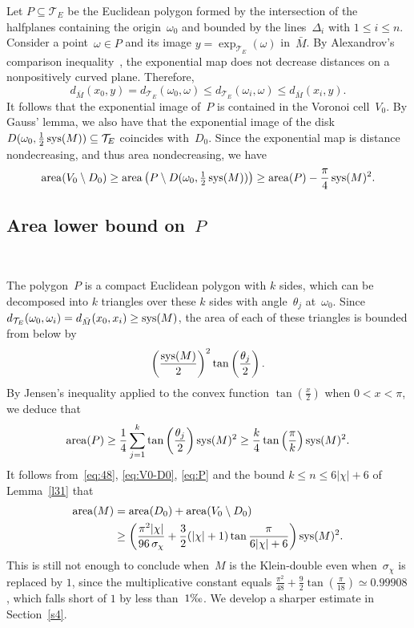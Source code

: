 \documentclass[12pt,reqno]{amsart}
\theoremstyle{definition}
\numberwithin{equation}{section}
\DeclareMathOperator{\area}{{\rm area}}
\DeclareMathOperator{\sys}{{\rm sys}}
\numberwithin{equation}{section}
\begin{document}
Let $P \subseteq \mathcal{T}_E$ be the Euclidean polygon formed by the
intersection of the halfplanes containing the origin~$\omega_0$ and
bounded by the lines~$\Delta_i$ with $1 \leq i \leq n$.  Consider a
point~$\omega \in P$ and its image
$y=\exp_{\mathcal{T}_E}^{\phantom{I^I_I}}(\omega)$ in~$\bar{M}$.  By
  Alexandrov's comparison inequality~\cite[\S II]{BH},
the exponential map does not decrease distances on a nonpositively curved plane.
Therefore,
\[
d_{\bar{M}}(x_0,y) = d_{\mathcal{T}_E}(\omega_0,\omega) \leq d_{\mathcal{T}_E}(\omega_i,\omega) \leq d_{\bar{M}}(x_i,y).
\]
It follows that the exponential image of~$P$ is contained in the Voronoi cell~$V_0$.
By Gauss' lemma, we also have that the exponential image of the disk $D(\omega_0,\frac{1}{2} \sys(M)) \subseteq \mathcal{T}_E$ coincides with~$D_0$.
Since the exponential map is distance nondecreasing, and thus area nondecreasing, we have
\begin{equation} \label{eq:V0-D0}
\area(V_0 \setminus D_0) \geq \area\big(P \setminus D(\omega_0,\tfrac{1}{2} \sys(M))\big) \geq \area(P) - \frac{\pi}{4} \sys(M)^2.
\end{equation}

\subsection{Area lower bound on~$P$} \label{sec:PP}

\mbox{ } \medskip

The polygon~$P$ is a compact Euclidean polygon with $k$ sides, which can be decomposed into $k$ triangles over these $k$ sides with angle~$\theta_j$ at~$\omega_0$.
Since $d_{\mathcal{T}_E}(\omega_0,\omega_i) = d_{\bar{M}}(x_0,x_i) \geq \sys(M)$, the area of each of these triangles is bounded from below by
\begin{equation} \label{eq:tan}
\left( \frac{\sys(M)}{2} \right)^2 \tan \left( \frac{\theta_j}{2} \right).
\end{equation}
By Jensen's inequality applied to the convex function $\tan(\frac{x}{2})$ when $0<x<\pi$, we deduce that
\begin{equation} \label{eq:P}
\area(P) \geq \frac{1}{4}  \sum_{j=1}^k \tan \left( \frac{\theta_j}{2} \right) \sys(M)^2 \geq \frac{k}{4}  \tan \left( \frac{\pi}{k} \right)  \sys(M)^2.
\end{equation}
It follows from~\eqref{eq:48}, \eqref{eq:V0-D0}, \eqref{eq:P} and the
bound $k \leq n \leq 6|\chi|+6$ of Lemma~\ref{l31} that
\begin{align*}
\area(M) & = \area(D_0) + \area(V_0 \setminus D_0) \\
 & \geq \left( \frac{\pi^2 |\chi|}{96 \, \sigma_\chi} + \frac{3}{2} (|\chi|+1) \tan \frac{\pi}{6|\chi|+6} \right) \sys(M)^2.
\end{align*}
This is still not enough to conclude when~$M$ is the Klein-double even
when~$\sigma_\chi$ is replaced by $1$, since
the multiplicative constant equals $\frac{\pi^2}{48} + \frac{9}{2}
\tan \left(\frac{\pi}{18}\right) \simeq 0.99908$, which falls short of
$1$ by less than~$1\text{\textperthousand}$.  We develop a sharper
estimate in Section~\ref{s4}.
\end{document}
